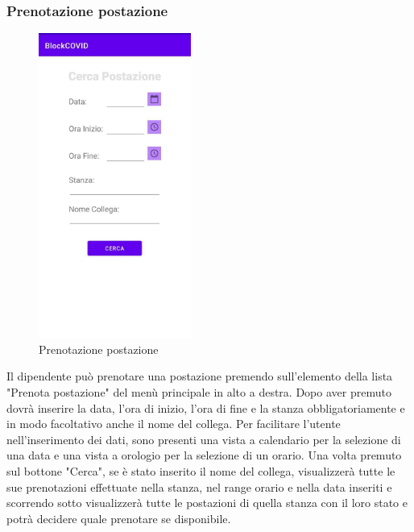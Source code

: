 	\subsubsection{Prenotazione postazione}
	\begin{figure}[H]
		\centering
		\includegraphics[width=5cm]{res/images/PrenotaPostazione.png}
		\caption{Prenotazione postazione}
	\end{figure}
	Il dipendente può prenotare una postazione premendo sull'elemento della lista "Prenota postazione" del menù principale in alto a destra.
	Dopo aver premuto dovrà inserire la data, l'ora di inizio, l'ora di fine e la stanza obbligatoriamente e in modo facoltativo anche il nome del collega. Per facilitare l'utente nell'inserimento dei dati, sono presenti una vista a calendario per la selezione di una data e una vista a orologio per la selezione di un orario. Una volta premuto sul bottone "Cerca", se è stato inserito il nome del collega, visualizzerà tutte le sue prenotazioni effettuate nella stanza, nel range orario e nella data inseriti e scorrendo sotto visualizzerà tutte le postazioni di quella stanza con il loro stato e potrà decidere quale prenotare se disponibile. 
	
	
